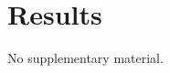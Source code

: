 \documentclass{article}
\begin{document}
\section{Results}
No supplementary material.
\end{document}
